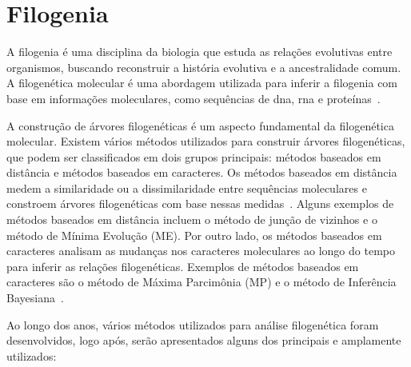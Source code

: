 \section{Filogenia}

A filogenia é uma disciplina da biologia que estuda as relações evolutivas entre organismos, buscando reconstruir a história evolutiva e a ancestralidade comum. A filogenética molecular é uma abordagem utilizada para inferir a filogenia com base em informações moleculares, como sequências de \gls{dna}, \gls{rna} e proteínas~\cite{felsenstein_inferring_2004}.

A construção de árvores filogenéticas é um aspecto fundamental da filogenética molecular. Existem vários métodos utilizados para construir árvores filogenéticas, que podem ser classificados em dois grupos principais: métodos baseados em distância e métodos baseados em caracteres.
Os métodos baseados em distância medem a similaridade ou a dissimilaridade entre sequências moleculares e constroem árvores filogenéticas com base nessas medidas~\cite{saitou_neighbor_1987,felsenstein_inferring_2004}. Alguns exemplos de métodos baseados em distância incluem o método de junção de vizinhos e o método de Mínima Evolução (ME).
Por outro lado, os métodos baseados em caracteres analisam as mudanças nos caracteres moleculares ao longo do tempo para inferir as relações filogenéticas. Exemplos de métodos baseados em caracteres são o método de Máxima Parcimônia (MP) e o método de Inferência Bayesiana~\cite{swofford_phylogenetic_1996}.

Ao longo dos anos, vários métodos utilizados para análise filogenética foram desenvolvidos, logo após, serão apresentados alguns dos principais e amplamente utilizados:

